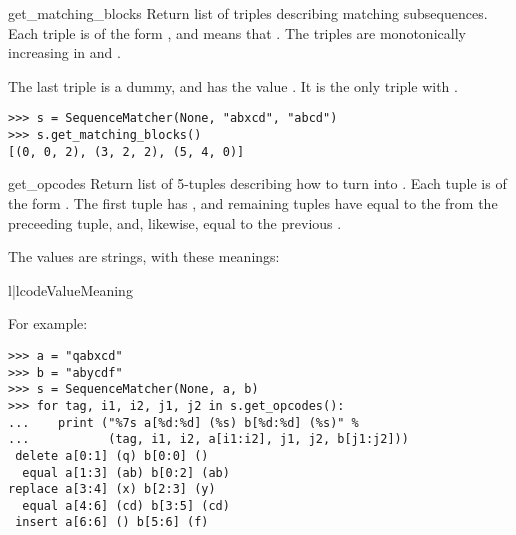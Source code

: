 \begin{methoddesc}{get_matching_blocks}{}
  Return list of triples describing matching subsequences.
  Each triple is of the form , and
  means that .  The triples are monotonically
  increasing in  and .

  The last triple is a dummy, and has the value .  It is the only triple with .

\begin{verbatim}
>>> s = SequenceMatcher(None, "abxcd", "abcd")
>>> s.get_matching_blocks()
[(0, 0, 2), (3, 2, 2), (5, 4, 0)]
\end{verbatim}
\end{methoddesc}

\begin{methoddesc}{get_opcodes}{}
  Return list of 5-tuples describing how to turn  into .
  Each tuple is of the form .  The first tuple has , and remaining tuples have  equal to the
   from the preceeding tuple, and, likewise,  equal to
  the previous .

  The  values are strings, with these meanings:

\begin{tableii}{l|l}{code}{Value}{Meaning}
\end{tableii}

For example:

\begin{verbatim}
>>> a = "qabxcd"
>>> b = "abycdf"
>>> s = SequenceMatcher(None, a, b)
>>> for tag, i1, i2, j1, j2 in s.get_opcodes():
...    print ("%7s a[%d:%d] (%s) b[%d:%d] (%s)" %
...           (tag, i1, i2, a[i1:i2], j1, j2, b[j1:j2]))
 delete a[0:1] (q) b[0:0] ()
  equal a[1:3] (ab) b[0:2] (ab)
replace a[3:4] (x) b[2:3] (y)
  equal a[4:6] (cd) b[3:5] (cd)
 insert a[6:6] () b[5:6] (f)
\end{verbatim}
\end{methoddesc}

